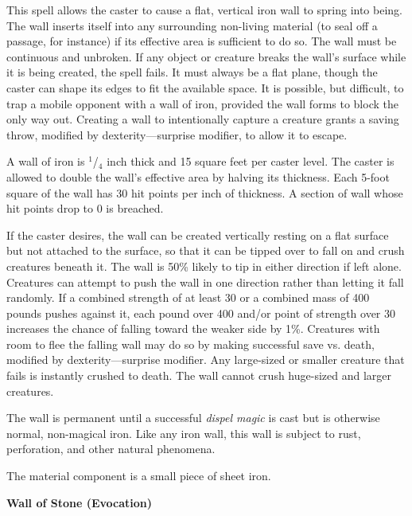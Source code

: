 \begin{multicols}{2}
This spell allows the caster to cause a flat, vertical iron wall to spring into being.  The wall inserts itself into any surrounding non-living material (to seal off a passage, for instance) if its effective area is sufficient to do so.  The wall must be continuous and unbroken.  If any object or creature breaks the wall's surface while it is being created, the spell fails.  It must always be a flat plane, though the caster can shape its edges to fit the available space.   It is possible, but difficult, to trap a mobile opponent with a wall of iron, provided the wall forms to block the only way out.  Creating a wall to intentionally capture a creature grants a saving throw, modified by dexterity---surprise modifier, to allow it to escape.

A wall of iron is $^1$/$_4$ inch thick and 15 square feet per caster level.  The caster is allowed to double the wall's effective area by halving its thickness.  Each 5-foot square of the wall has 30 hit points per inch of thickness.  A section of wall whose hit points drop to 0 is breached.  

If the caster desires, the wall can be created vertically resting on a flat surface but not attached to the surface, so that it can be tipped over to fall on and crush creatures beneath it.  The wall is 50\% likely to tip in either direction if left alone.  Creatures can attempt to push the wall in one direction rather than letting it fall randomly.  If a combined strength of at least 30 or a combined mass of 400 pounds pushes against it, each pound over 400 and/or point of strength over 30 increases the chance of falling toward the weaker side by 1\%.  Creatures with room to flee the falling wall may do so by making successful save vs. death, modified by dexterity---surprise modifier.  Any large-sized or smaller creature that fails is instantly crushed to death. The wall cannot crush huge-sized and larger creatures. 

The wall is permanent until a successful \textit{dispel magic} is cast but is otherwise normal, non-magical iron.  Like any iron wall, this wall is subject to rust, perforation, and other natural phenomena.

The material component is a small piece of sheet iron.

\vspace{1em}

\noindent
\begin{minipage}{\columnwidth}

\noindent \textbf{Wall of Stone (Evocation)}


\end{minipage}
\end{multicols}
